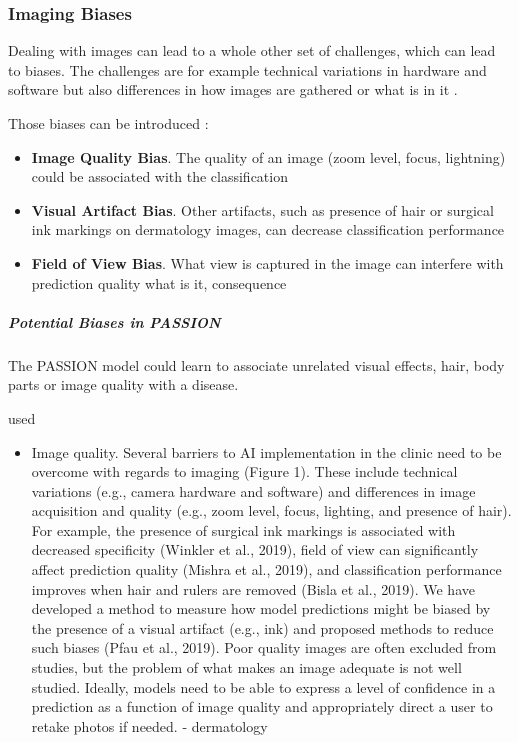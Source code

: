\documentclass[12pt, a4paper, oneside]{book}   	%
\renewcommand{\paragraph}[1]{%
	\subsubsection*{#1}%
}
\newif\ifrawcitationactive
\newcommand{\rawcitationstart}{
	\color{purple}\rawcitationactivetrue
}
\newcommand{\rawcitationend}{
	\color{black}\rawcitationactivefalse
}
\newcommand{\rawcitationusedstart}{\color{violet}}
\newcommand{\rawcitationusedend}{%
	\ifrawcitationactive
	\color{purple}  %
	\else
	\color{black}  %
	\fi
}
\begin{document}
			
			\paragraph{Imaging Biases}
			Dealing with images can lead to a whole other set of challenges, which can lead to biases. The challenges are for example technical variations in hardware and software but also differences in how images are gathered or what is in it \autocite{Young_2020}.

			Those biases can be introduced :
			\begin{itemize}
				\item \textbf{Image Quality Bias}. The quality of an image (zoom level, focus, lightning) could be associated with the classification \autocite{Young_2020}
				\item \textbf{Visual Artifact Bias}. Other artifacts, such as presence of hair or surgical ink markings on dermatology images, can decrease classification performance \autocite{Winkler et al., 2019 & Bisla et al., 2019 (from Young_2020)}
				\item \textbf{Field of View Bias}. What view is captured in the image can interfere with prediction quality  what is it, consequence \autocite{Mishra et al., 2019 from Young_2020}
			\end{itemize}
			
			
			\subparagraph{Potential Biases in PASSION}
			The PASSION model could learn to associate unrelated visual effects, hair, body parts or image quality with a disease.
			
			
			\rawcitationstart
			used
			\begin{itemize}		
				\rawcitationusedstart
				\item Image quality. Several barriers to \gls{AI} implementation in the clinic need to be overcome with regards to imaging (Figure 1). These include technical variations (e.g., camera hardware and software) and differences in image acquisition and quality (e.g., zoom level, focus, lighting, and presence of hair). For example, the presence of surgical ink markings is associated with decreased specificity (Winkler et al., 2019), field of view can significantly affect prediction quality (Mishra et al., 2019), and classification performance improves when hair and rulers are removed (Bisla et al., 2019). We have developed a method to measure how model predictions might be biased by the presence of a visual artifact (e.g., ink) and proposed methods to reduce such biases (Pfau et al., 2019). Poor quality images are often excluded from studies, but the problem of what makes an image adequate is not well studied. Ideally, models need to be able to express a level of confidence in a prediction as a function of image quality and appropriately direct a user to retake photos if needed. \autocite{Young_2020} - dermatology
				\rawcitationusedend
			\end{itemize}
			\rawcitationend
			
\end{document}
